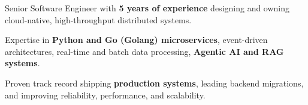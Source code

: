 \begin{zitemize}
    \item Senior Software Engineer with \textbf{5 years of experience} designing and owning cloud-native, high-throughput distributed systems.
    \item Expertise in \textbf{Python and Go (Golang) microservices}, event-driven architectures, real-time and batch data processing, \textbf{Agentic AI and RAG systems}.
    \item Proven track record shipping \textbf{production systems}, leading backend migrations, and improving reliability, performance, and scalability.
\end{zitemize}
